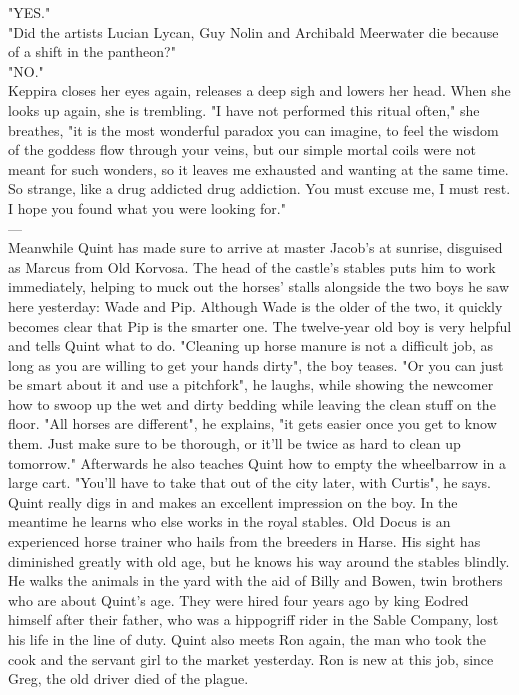 "YES."\\

"Did the artists Lucian Lycan, Guy Nolin and Archibald Meerwater die because of a shift in the pantheon?"\\

"NO."\\

Keppira closes her eyes again, releases a deep sigh and lowers her head. When she looks up again, she is trembling. "I have not performed this ritual often," she breathes, "it is the most wonderful paradox you can imagine, to feel the wisdom of the goddess flow through your veins, but our simple mortal coils were not meant for such wonders, so it leaves me exhausted and wanting at the same time. So strange, like a drug addicted drug addiction. You must excuse me, I must rest. I hope you found what you were looking for."\\

---\\

Meanwhile Quint has made sure to arrive at master Jacob's at sunrise, disguised as Marcus from Old Korvosa. The head of the castle's stables puts him to work immediately, helping to muck out the horses' stalls alongside the two boys he saw here yesterday: Wade and Pip. Although Wade is the older of the two, it quickly becomes clear that Pip is the smarter one. The twelve-year old boy is very helpful and tells Quint what to do. "Cleaning up horse manure is not a difficult job, as long as you are willing to get your hands dirty", the boy teases. "Or you can just be smart about it and use a pitchfork", he laughs, while showing the newcomer how to swoop up the wet and dirty bedding while leaving the clean stuff on the floor. "All horses are different", he explains, "it gets easier once you get to know them. Just make sure to be thorough, or it'll be twice as hard to clean up tomorrow." Afterwards he also teaches Quint how to empty the wheelbarrow in a large cart. "You'll have to take that out of the city later, with Curtis", he says.\\

Quint really digs in and makes an excellent impression on the boy. In the meantime he learns who else works in the royal stables. Old Docus is an experienced horse trainer who hails from the breeders in Harse. His sight has diminished greatly with old age, but he knows his way around the stables blindly. He walks the animals in the yard with the aid of Billy and Bowen, twin brothers who are about Quint's age. They were hired four years ago by king Eodred himself after their father, who was a hippogriff rider in the Sable Company, lost his life in the line of duty. Quint also meets Ron again, the man who took the cook and the servant girl to the market yesterday. Ron is new at this job, since Greg, the old driver died of the plague.\\

